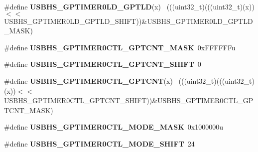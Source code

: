 \begin{DoxyCompactItemize}
\item 
\hypertarget{group___u_s_b_h_s___register___masks_gaf75ee454623252fef17abc9c91f8adbe}{}\#define {\bfseries U\+S\+B\+H\+S\+\_\+\+G\+P\+T\+I\+M\+E\+R0\+L\+D\+\_\+\+G\+P\+T\+L\+D}(x)                            ~(((uint32\+\_\+t)(((uint32\+\_\+t)(x))$<$$<$U\+S\+B\+H\+S\+\_\+\+G\+P\+T\+I\+M\+E\+R0\+L\+D\+\_\+\+G\+P\+T\+L\+D\+\_\+\+S\+H\+I\+F\+T))\&U\+S\+B\+H\+S\+\_\+\+G\+P\+T\+I\+M\+E\+R0\+L\+D\+\_\+\+G\+P\+T\+L\+D\+\_\+\+M\+A\+S\+K)\label{group___u_s_b_h_s___register___masks_gaf75ee454623252fef17abc9c91f8adbe}

\item 
\hypertarget{group___u_s_b_h_s___register___masks_gaf103a158f47c90d17773c3fd048f35c2}{}\#define {\bfseries U\+S\+B\+H\+S\+\_\+\+G\+P\+T\+I\+M\+E\+R0\+C\+T\+L\+\_\+\+G\+P\+T\+C\+N\+T\+\_\+\+M\+A\+S\+K}~0x\+F\+F\+F\+F\+F\+Fu\label{group___u_s_b_h_s___register___masks_gaf103a158f47c90d17773c3fd048f35c2}

\item 
\hypertarget{group___u_s_b_h_s___register___masks_ga36c2e66ba949882197e873480c3371bb}{}\#define {\bfseries U\+S\+B\+H\+S\+\_\+\+G\+P\+T\+I\+M\+E\+R0\+C\+T\+L\+\_\+\+G\+P\+T\+C\+N\+T\+\_\+\+S\+H\+I\+F\+T}~0\label{group___u_s_b_h_s___register___masks_ga36c2e66ba949882197e873480c3371bb}

\item 
\hypertarget{group___u_s_b_h_s___register___masks_gaafc2b8763c8a7b35a71072729324d379}{}\#define {\bfseries U\+S\+B\+H\+S\+\_\+\+G\+P\+T\+I\+M\+E\+R0\+C\+T\+L\+\_\+\+G\+P\+T\+C\+N\+T}(x)                        ~(((uint32\+\_\+t)(((uint32\+\_\+t)(x))$<$$<$U\+S\+B\+H\+S\+\_\+\+G\+P\+T\+I\+M\+E\+R0\+C\+T\+L\+\_\+\+G\+P\+T\+C\+N\+T\+\_\+\+S\+H\+I\+F\+T))\&U\+S\+B\+H\+S\+\_\+\+G\+P\+T\+I\+M\+E\+R0\+C\+T\+L\+\_\+\+G\+P\+T\+C\+N\+T\+\_\+\+M\+A\+S\+K)\label{group___u_s_b_h_s___register___masks_gaafc2b8763c8a7b35a71072729324d379}

\item 
\hypertarget{group___u_s_b_h_s___register___masks_ga19cf3b6c616aaeb2c3849acd3ff71f05}{}\#define {\bfseries U\+S\+B\+H\+S\+\_\+\+G\+P\+T\+I\+M\+E\+R0\+C\+T\+L\+\_\+\+M\+O\+D\+E\+\_\+\+M\+A\+S\+K}~0x1000000u\label{group___u_s_b_h_s___register___masks_ga19cf3b6c616aaeb2c3849acd3ff71f05}

\item 
\hypertarget{group___u_s_b_h_s___register___masks_gaa4efb5e0dbcd89b5c4f640536da28006}{}\#define {\bfseries U\+S\+B\+H\+S\+\_\+\+G\+P\+T\+I\+M\+E\+R0\+C\+T\+L\+\_\+\+M\+O\+D\+E\+\_\+\+S\+H\+I\+F\+T}~24\label{group___u_s_b_h_s___register___masks_gaa4efb5e0dbcd89b5c4f640536da28006}


\end{DoxyCompactItemize}
